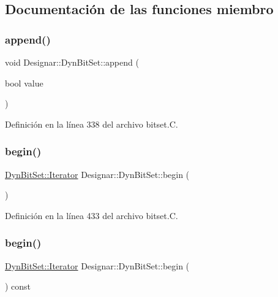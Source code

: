 \subsection{Documentación de las funciones miembro}
\mbox{\label{class_designar_1_1_dyn_bit_set_a061298007ec0f5743f1f7f7f7e87988c}} 
\subsubsection{\texorpdfstring{append()}{append()}}
{\footnotesize\ttfamily void Designar\+::\+Dyn\+Bit\+Set\+::append (\begin{DoxyParamCaption}\item[{bool}]{value }\end{DoxyParamCaption})}



Definición en la línea 338 del archivo bitset.\+C.

\mbox{\label{class_designar_1_1_dyn_bit_set_a40cde0bc849513bbad925b4733d777f6}} 
\subsubsection{\texorpdfstring{begin()}{begin()}\hspace{0.1cm}{\footnotesize\ttfamily [1/2]}}
{\footnotesize\ttfamily \hyperlink{class_designar_1_1_dyn_bit_set_1_1_iterator}{Dyn\+Bit\+Set\+::\+Iterator} Designar\+::\+Dyn\+Bit\+Set\+::begin (\begin{DoxyParamCaption}{ }\end{DoxyParamCaption})}



Definición en la línea 433 del archivo bitset.\+C.

\mbox{\label{class_designar_1_1_dyn_bit_set_a73c8564a300f36934b2de273c1f8eb18}} 
\subsubsection{\texorpdfstring{begin()}{begin()}\hspace{0.1cm}{\footnotesize\ttfamily [2/2]}}
{\footnotesize\ttfamily \hyperlink{class_designar_1_1_dyn_bit_set_1_1_iterator}{Dyn\+Bit\+Set\+::\+Iterator} Designar\+::\+Dyn\+Bit\+Set\+::begin (\begin{DoxyParamCaption}{ }\end{DoxyParamCaption}) const}



